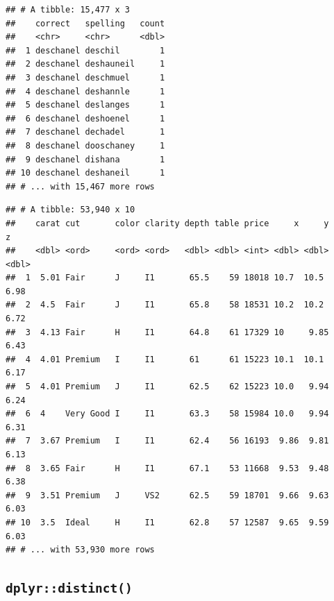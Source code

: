 \documentclass[]{book}
\newenvironment{Shaded}{\begin{snugshade}}{\end{snugshade}}
\newcommand{\KeywordTok}[1]{\textcolor[rgb]{0.13,0.29,0.53}{\textbf{#1}}}
\newcommand{\NormalTok}[1]{#1}
\newcommand{\OperatorTok}[1]{\textcolor[rgb]{0.81,0.36,0.00}{\textbf{#1}}}
\newcommand{\StringTok}[1]{\textcolor[rgb]{0.31,0.60,0.02}{#1}}
\begin{document}
\begin{verbatim}
## # A tibble: 15,477 x 3
##    correct   spelling   count
##    <chr>     <chr>      <dbl>
##  1 deschanel deschil        1
##  2 deschanel deshauneil     1
##  3 deschanel deschmuel      1
##  4 deschanel deshannle      1
##  5 deschanel deslanges      1
##  6 deschanel deshoenel      1
##  7 deschanel dechadel       1
##  8 deschanel dooschaney     1
##  9 deschanel dishana        1
## 10 deschanel deshaneil      1
## # ... with 15,467 more rows
\end{verbatim}

\begin{Shaded}
\end{Shaded}

\begin{verbatim}
## # A tibble: 53,940 x 10
##    carat cut       color clarity depth table price     x     y     z
##    <dbl> <ord>     <ord> <ord>   <dbl> <dbl> <int> <dbl> <dbl> <dbl>
##  1  5.01 Fair      J     I1       65.5    59 18018 10.7  10.5   6.98
##  2  4.5  Fair      J     I1       65.8    58 18531 10.2  10.2   6.72
##  3  4.13 Fair      H     I1       64.8    61 17329 10     9.85  6.43
##  4  4.01 Premium   I     I1       61      61 15223 10.1  10.1   6.17
##  5  4.01 Premium   J     I1       62.5    62 15223 10.0   9.94  6.24
##  6  4    Very Good I     I1       63.3    58 15984 10.0   9.94  6.31
##  7  3.67 Premium   I     I1       62.4    56 16193  9.86  9.81  6.13
##  8  3.65 Fair      H     I1       67.1    53 11668  9.53  9.48  6.38
##  9  3.51 Premium   J     VS2      62.5    59 18701  9.66  9.63  6.03
## 10  3.5  Ideal     H     I1       62.8    57 12587  9.65  9.59  6.03
## # ... with 53,930 more rows
\end{verbatim}

\hypertarget{dplyrdistinct}{%
\subsection{\texorpdfstring{\texttt{dplyr::distinct()}}{dplyr::distinct()}}\label{dplyrdistinct}}

\begin{Shaded}
\end{Shaded}
\end{document}
